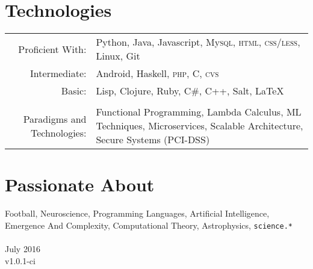 \documentclass[a4paper,11pt]{article}
\begin{document}
\section{Technologies}
\begin{tabular}{rp{8cm}}
 Proficient With:& Python, Java, Javascript, My\textsc{sql}, \textsc{html}, \textsc{css/less}, Linux, Git\\
Intermediate:& Android, Haskell, \textsc{php}, \textsc{C}, \textsc{cvs}\\
Basic: & Lisp, Clojure, Ruby, \textsc{C\#}, \textsc{C++}, Salt,     {\LaTeX}\\
\\
Paradigms and Technologies: & Functional Programming, Lambda Calculus, ML Techniques, Microservices, Scalable Architecture, Secure Systems (PCI-DSS)
\end{tabular}

\section{Passionate About}
Football, Neuroscience, Programming Languages, Artificial Intelligence, Emergence And Complexity, Computational Theory, Astrophysics, \texttt{science.*} \\

\\[40pt]
\footnotesize{July 2016} \\
\footnotesize{v1.0.1-ci}
\end{document}
